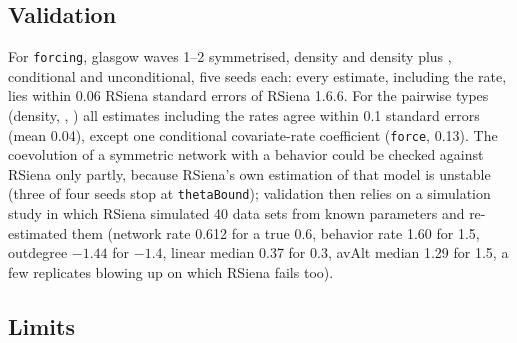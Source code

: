 \subsection{Validation}

For \texttt{forcing}, glasgow waves 1--2 symmetrised, density and density plus , conditional and unconditional, five seeds each: every estimate, including the rate, lies within 0.06 RSiena standard errors of RSiena 1.6.6. For the pairwise types (density, , ) all estimates including the rates agree within 0.1 standard errors (mean 0.04), except one conditional covariate-rate coefficient (\texttt{force}, 0.13). The coevolution of a symmetric network with a behavior could be checked against RSiena only partly, because RSiena's own estimation of that model is unstable (three of four seeds stop at \texttt{thetaBound}); validation then relies on a simulation study in which RSiena simulated 40 data sets from known parameters and \nwsaom{} re-estimated them (network rate 0.612 for a true 0.6, behavior rate 1.60 for 1.5, outdegree $-1.44$ for $-1.4$, linear median 0.37 for 0.3, avAlt median 1.29 for 1.5, a few replicates blowing up on which RSiena fails too).

\subsection{Limits}\label{sec:sym-limits}

